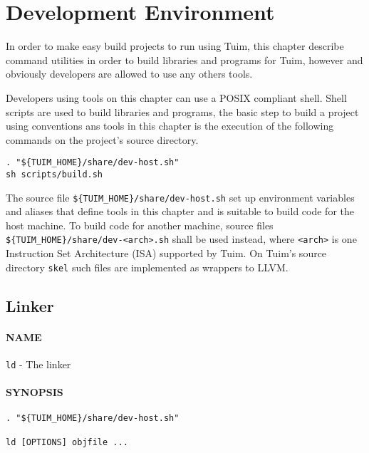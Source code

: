 \chapter{Development Environment}

In order to make easy build projects to run using Tuim,
this chapter describe command utilities in order to build
libraries and programs for Tuim,
however and obviously developers are allowed to use any others tools.

Developers using tools on this chapter can use
a POSIX compliant shell\cite{posix}.
Shell scripts are used to build libraries and programs,
the basic step to build a project using conventions ans tools in this chapter is
the execution of the following commands on the project's source directory.

\begin{lstlisting}[style=bash]
. "${TUIM_HOME}/share/dev-host.sh"
sh scripts/build.sh
\end{lstlisting}

The source file \texttt{\$\{TUIM\_HOME\}/share/dev-host.sh}
set up environment variables and aliases that define tools in this chapter
and is suitable to build code for the host machine.
To build code for another machine, source files
\texttt{\$\{TUIM\_HOME\}/share/dev-<arch>.sh} shall be used instead,
where \texttt{<arch>} is one Instruction Set Architecture (ISA)
supported by Tuim.
On Tuim's source directory \texttt{skel} such files are implemented as
wrappers to LLVM.

\newpage
\section{Linker}

\subsubsection*{NAME}

\texttt{ld} - The linker

\subsubsection*{SYNOPSIS}

\begin{lstlisting}[style=bash]
. "${TUIM_HOME}/share/dev-host.sh"

ld [OPTIONS] objfile ...
\end{lstlisting}

